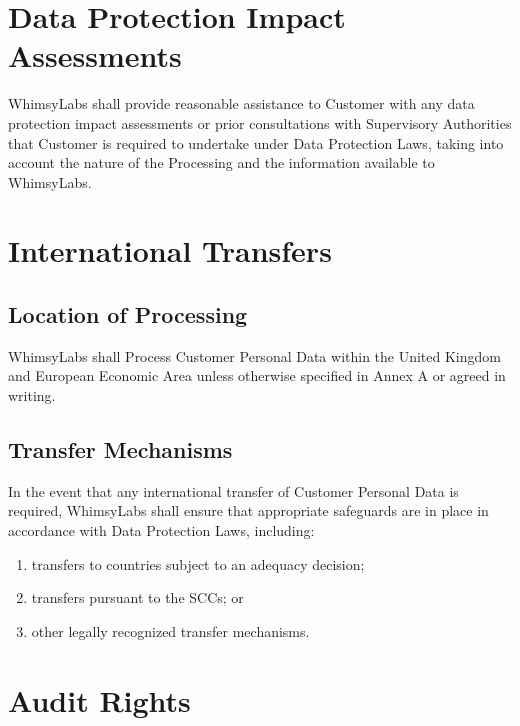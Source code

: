 \documentclass[11pt,a4paper]{article}
\begin{document}
\section{Data Protection Impact Assessments}

WhimsyLabs shall provide reasonable assistance to Customer with any data protection impact assessments or prior consultations with Supervisory Authorities that Customer is required to undertake under Data Protection Laws, taking into account the nature of the Processing and the information available to WhimsyLabs.

\section{International Transfers}

\subsection{Location of Processing}
WhimsyLabs shall Process Customer Personal Data within the United Kingdom and European Economic Area unless otherwise specified in Annex A or agreed in writing.

\subsection{Transfer Mechanisms}
In the event that any international transfer of Customer Personal Data is required, WhimsyLabs shall ensure that appropriate safeguards are in place in accordance with Data Protection Laws, including:
\begin{enumerate}[label=(\alph*)]
    \item transfers to countries subject to an adequacy decision;
    \item transfers pursuant to the SCCs; or
    \item other legally recognized transfer mechanisms.
\end{enumerate}

\section{Audit Rights}
\end{document}
